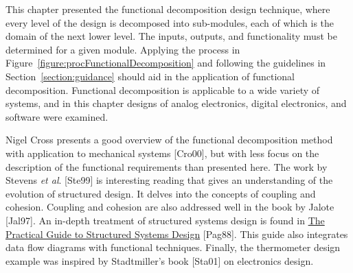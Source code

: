 This chapter presented the functional decomposition design technique,
where every level of the design is decomposed into sub-modules, each of
which is the domain of the next lower level. The inputs, outputs, and
functionality must be determined for a given module. Applying the
process in Figure~\ref{figure:procFunctionalDecomposition}
and following the guidelines in Section~\ref{section:guidance} should
aid in the application of functional decomposition. Functional
decomposition is applicable to a wide variety of systems, and in this
chapter designs of analog electronics, digital electronics, and software
were examined.

Nigel Cross presents a good overview of the functional decomposition
method with application to mechanical systems {[}Cro00{]}, but with less
focus on the description of the functional requirements than presented
here. The work by Stevens \emph{et al}. {[}Ste99{]} is interesting
reading that gives an understanding of the evolution of structured
design. It delves into the concepts of coupling and cohesion. Coupling
and cohesion are also addressed well in the book by Jalote {[}Jal97{]}.
An in-depth treatment of structured systems design is found in \ul{The
Practical Guide to Structured Systems Design} {[}Pag88{]}. This guide
also integrates data flow diagrams with functional techniques. Finally,
the thermometer design example was inspired by Stadtmiller's book
{[}Sta01{]} on electronics design.
